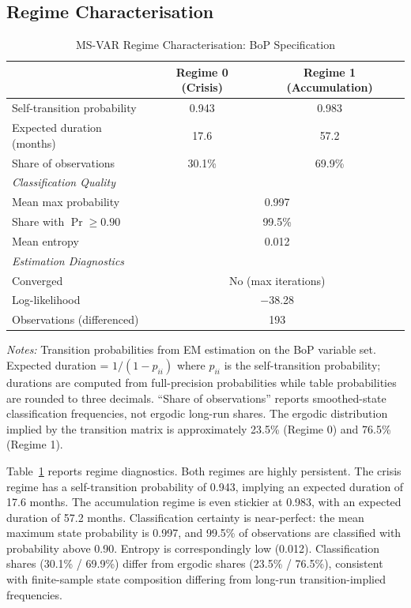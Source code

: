 \documentclass[12pt,a4paper]{article}
\begin{document}
\subsection{Regime Characterisation}
\label{sec:regime_char}

\begin{table}[htbp]
\centering
\caption{MS-VAR Regime Characterisation: BoP Specification}
\label{tab:regime_char}
\begin{tabular}{lcc}
\toprule
& Regime 0 (Crisis) & Regime 1 (Accumulation) \\
\midrule
Self-transition probability & 0.943 & 0.983 \\
Expected duration (months) & 17.6 & 57.2 \\
Share of observations & 30.1\% & 69.9\% \\
\midrule
\multicolumn{3}{l}{\textit{Classification Quality}} \\
Mean max probability & \multicolumn{2}{c}{0.997} \\
Share with $\Pr \geq 0.90$ & \multicolumn{2}{c}{99.5\%} \\
Mean entropy & \multicolumn{2}{c}{0.012} \\
\midrule
\multicolumn{3}{l}{\textit{Estimation Diagnostics}} \\
Converged & \multicolumn{2}{c}{No (max iterations)} \\
Log-likelihood & \multicolumn{2}{c}{$-$38.28} \\
Observations (differenced) & \multicolumn{2}{c}{193} \\
\bottomrule
\end{tabular}
\begin{tablenotes}
\small
\item \textit{Notes:} Transition probabilities from EM estimation on the BoP variable set. Expected duration = $1/(1-p_{ii})$ where $p_{ii}$ is the self-transition probability; durations are computed from full-precision probabilities while table probabilities are rounded to three decimals. ``Share of observations'' reports smoothed-state classification frequencies, not ergodic long-run shares. The ergodic distribution implied by the transition matrix is approximately 23.5\% (Regime 0) and 76.5\% (Regime 1).
\end{tablenotes}
\end{table}

Table~\ref{tab:regime_char} reports regime diagnostics. Both regimes are highly persistent. The crisis regime has a self-transition probability of 0.943, implying an expected duration of 17.6 months. The accumulation regime is even stickier at 0.983, with an expected duration of 57.2 months. Classification certainty is near-perfect: the mean maximum state probability is 0.997, and 99.5\% of observations are classified with probability above 0.90. Entropy is correspondingly low (0.012). Classification shares (30.1\% / 69.9\%) differ from ergodic shares (23.5\% / 76.5\%), consistent with finite-sample state composition differing from long-run transition-implied frequencies.
\end{document}
